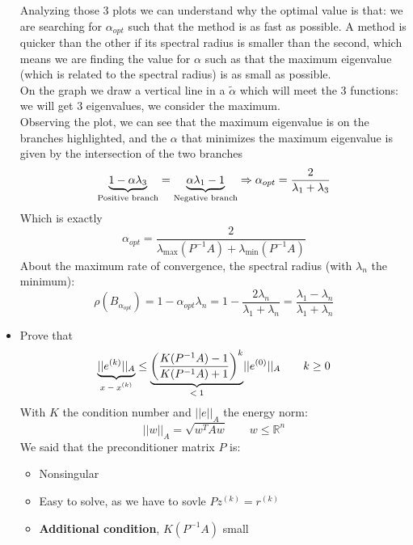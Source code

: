\begin{itemize}
        Analyzing those 3 plots we can understand why the optimal value is that: we are searching for $\alpha_{opt}$ such that the method is as fast as possible. A method is quicker than the other if its spectral radius is smaller than the second, which means we are finding the value for $\alpha$ such as that the maximum eigenvalue (which is related to the spectral radius) is as small as possible.\\
        On the graph we draw a vertical line in a $\tilde{\alpha}$ which will meet the 3 functions: we will get 3 eigenvalues, we consider the maximum.\\
        Observing the plot, we can see that the maximum eigenvalue is on the branches highlighted, and the $\alpha$ that minimizes the maximum eigenvalue is given by the intersection of the two branches
        $$
        \underlabel{
            1-\alpha\lambda_3
        }{Positive branch}=
        \underlabel{
            \alpha\lambda_1-1
        }{Negative branch}
        \Rightarrow
        \alpha_{opt}=\frac{2}{\lambda_1+\lambda_3}
        $$
        Which is exactly
        $$
        \alpha_{opt}=\frac{2}{\lambda_{\max}(P^{-1}A)+\lambda_{\min}(P^{-1}A)}
        $$
        About the maximum rate of convergence, the spectral radius (with $\lambda_n$ the minimum):
        $$
        \rho(B_{\alpha_{opt}})=1-\alpha_{opt}\lambda_n=
        1-\frac{2\lambda_n}{\lambda_1+\lambda_n}=
        \frac{\lambda_1-\lambda_n}{\lambda_1+\lambda_n}
        $$
        \item Prove that
        $$
        \underlabel{||e^{(k)}||_A}{$x-x^{(k)}$}\leq
        \underlabel{
            \left(
                \frac{
                    K(P^{-1}A)-1
                }{
                    K(P^{-1}A)+1
                }
            \right)^k
        }{
            $<1$
        }||e^{(0)}||_A
        \qquad k\geq 0
        $$
        With $K$ the condition number and $||e||_A$ the energy norm:
        $$
        ||w||_A=\sqrt{w^TAw}\qquad w\leq\mathbb{R}^n
        $$
        We said that the preconditioner matrix $P$ is:
        \begin{itemize}
            \item Nonsingular
            \item Easy to solve, as we have to sovle $Pz^{(k)}=r^{(k)}$
            \item \textbf{Additional condition}, $K(P^{-1}A)$ small
        \end{itemize}
    \end{itemize}

